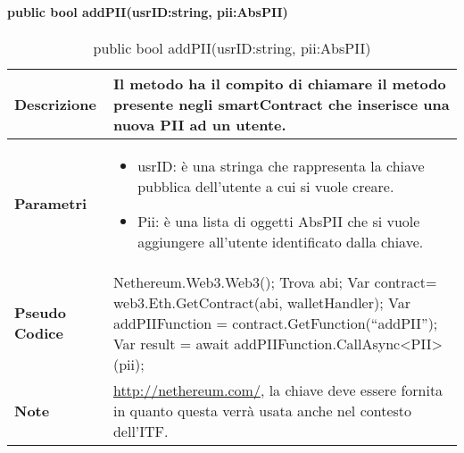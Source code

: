 \paragraph{public bool addPII(usrID:string, pii:AbsPII)}
\begin{center}
    \begin{longtable}{|p{3cm}|p{9cm}|}%
    \caption{public bool addPII(usrID:string, pii:AbsPII)}
    \label{tab:public-bool-addPIIImpl}
    \endfirsthead
    \endhead
    \hline
    \textbf{Descrizione} & Il metodo ha il compito di chiamare il metodo presente negli smartContract che inserisce una nuova PII ad un utente.\\
    \hline
    \textbf{Parametri} &      
    \begin{itemize}
        \item usrID: è una stringa che rappresenta la chiave pubblica dell’utente a cui si vuole creare.
        \item Pii: è una lista di oggetti AbsPII che si vuole aggiungere all’utente identificato dalla chiave.
    \end{itemize} 
    \\
    \hline
    \textbf{Pseudo Codice} & 
    Nethereum.Web3.Web3();\newline
    Trova abi;\newline 
    Var contract= web3.Eth.GetContract(abi, walletHandler);\newline
    Var addPIIFunction =  contract.GetFunction(“addPII”);\newline
    Var result = await addPIIFunction.CallAsync<PII>(pii);\newline
    \\
    \hline
    \textbf{Note} & \url{http://nethereum.com/}, la chiave deve essere fornita in quanto questa verrà usata anche nel contesto dell’ITF. \\
    \hline
    \end{longtable}
    \end{center}



